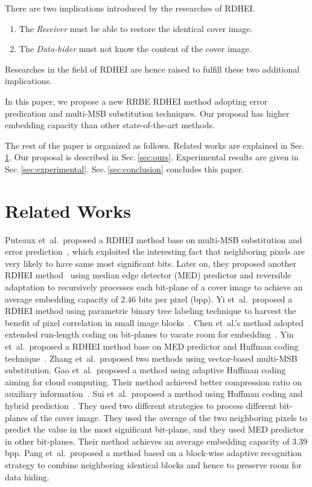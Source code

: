 \documentclass[journal]{IEEEtran}
\begin{document}
	There are two implications introduced by the researches of RDHEI.
	
	\begin{enumerate}
		\item The \emph{Receiver} must be able to restore the identical cover image.
		\item The \emph{Data-hider} must not know the content of the cover image.
	\end{enumerate}
%
	Researches in the field of RDHEI are hence raised to fulfill these two additional implications.
	
	In this paper, we propose a new RRBE RDHEI method adopting error predication and multi-MSB substitution techniques. 
	Our proposal has higher embedding capacity than other state-of-the-art methods.

	The rest of the paper is organized as follows. 
	Related works are explained in Sec.\,\ref{sec:related}. 
	Our proposal is described in Sec.\,\ref{sec:ours}. 
	Experimental results are given in Sec.\,\ref{sec:experimental}.
	Sec.\,\ref{sec:conclusion} concludes this paper. 


	\section{Related Works}
	\label{sec:related}
	
	Puteaux et~al.\ proposed a RDHEI method base on multi-MSB substitution and error prediction~\cite{Puteaux2018}, which exploited the interesting fact that neighboring pixels are very likely to have same most significant bits. 
%	
	Later on, they proposed another RDHEI method~\cite{Puteaux2021} using median edge detector (MED) predictor and reversible adaptation to recursively processes each bit-plane of a cover image to achieve an average embedding capacity of \(2.46\) bits per pixel (bpp).
%	
	Yi et~al.\ proposed a RDHEI method using parametric binary tree labeling technique to harvest the benefit of pixel correlation in small image blocks~\cite{Yi2019}.
%	
	Chen et~al.’s method adopted extended run-length coding on bit-planes to vacate room for embedding~\cite{Chen2019}.
%	
	Yin et~al.\ proposed a RDHEI method base on MED predictor and Huffman coding technique~\cite{Yin2020}.
%	
	Zhang et~al.\ proposed two methods using vector-based multi-MSB substitution\cite{Zhang2022}.
%	
	Gao et~al.\ proposed a method using adaptive Huffman coding aiming for cloud computing. 
	Their method achieved better compression ratio on auxiliary information~\cite{Gao2023}.
%	
	Sui et~al.\ proposed a method using Huffman coding and hybrid prediction~\cite{Sui2023}. 
	They used two different strategies to process different bit-planes of the cover image. 
	They used the average of the two neighboring pixels to predict the value in the most significant bit-plane, and they used MED predictor in other bit-planes. 
	Their method achieves an average embedding capacity of \(3.39\) bpp.
%	
	Pang et~al.\ proposed a method based on a block-wise adaptive recognition strategy to combine neighboring identical blocks and hence to preserve room for data hiding\cite{Pang2023}.
%	
	
\end{document}
